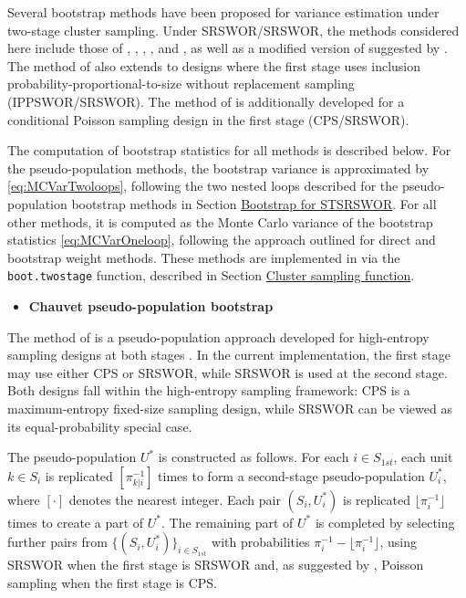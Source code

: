 Several bootstrap methods have been proposed for variance estimation under two-stage cluster sampling. Under SRSWOR/SRSWOR, the methods considered here include those of \citet{Rao:Wu:1988}, \citet{Rao:Wu:Yue:1992}, \citet{Funaoka:Saigo:Sitter:Toida:2006}, \citet{Chauvet:2007}, and \citet{Preston:2009}, as well as a modified version of \citet{Sitter:1992a} suggested by \citet{Chen:Haziza:Mashreghi:2022}. The method of \citet{Rao:Wu:Yue:1992} also extends to designs where the first stage uses inclusion probability-proportional-to-size without replacement sampling (IPPSWOR/SRSWOR). The method of \citet{Chauvet:2007} is additionally developed for a conditional Poisson sampling design in the first stage (CPS/SRSWOR).

The computation of bootstrap statistics for all methods is described below.
For the pseudo-population methods, the bootstrap variance is approximated by \eqref{eq:MCVarTwoloops}, following the two nested loops described for the pseudo-population bootstrap methods in Section \hyperref[Boot_STSRSWOR]{Bootstrap for STSRSWOR}. For all other methods, it is computed as the Monte Carlo variance of the bootstrap statistics \eqref{eq:MCVarOneloop}, following the approach outlined for direct and bootstrap weight methods.
These methods are implemented in  via the \texttt{boot.twostage} function, described in Section \hyperref[sec:pkgbootsurvclust]{Cluster sampling function}.

\begin{itemize}
\tightlist
\item
  \textbf{Chauvet pseudo-population bootstrap}
\end{itemize}

\noindent The method of \citet{Chauvet:2007} is a pseudo-population approach developed for high-entropy sampling designs at both stages \citep[e.g.,][]{Hajek:1964, Berger:1998, Matei:Tille:2005, Haziza:Rao:Mecatti:2008}. In the current implementation, the first stage may use either CPS or SRSWOR, while SRSWOR is used at the second stage. Both designs fall within the high-entropy sampling framework: CPS is a maximum-entropy fixed-size sampling design, while SRSWOR can be viewed as its equal-probability special case.

The pseudo-population \(U^*\) is constructed as follows. For each \(i \in \textrm{$S$}_{1st}\), each unit \(k \in \textrm{$S$}_i\) is replicated \([\pi_{k|i}^{-1}]\) times to form a second-stage pseudo-population \(U_i^*\), where \([\cdot]\) denotes the nearest integer. Each pair \((\textrm{$S$}_i, U_i^*)\) is replicated \(\lfloor \pi_i^{-1} \rfloor\) times to create a part of \(U^*\). The remaining part of \(U^*\) is completed by selecting further pairs from \(\{(\textrm{$S$}_i, U_i^*)\}_{i \in \textrm{$S$}_{1st}}\) with probabilities \(\pi_i^{-1} - \lfloor \pi_i^{-1} \rfloor\), using SRSWOR when the first stage is SRSWOR and, as suggested by \citet{Chauvet:2007}, Poisson sampling when the first stage is CPS.

